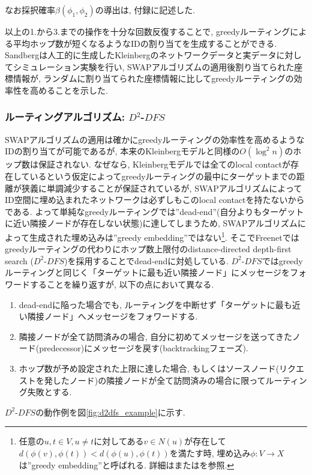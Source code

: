 \documentclass[dvipdfmx]{ampbt}
\begin{document}
   なお採択確率$\beta(\phi_1,\phi_2)$の導出は, 付録に記述した.

   以上の1.から3.までの操作を十分な回数反復することで, greedyルーティングによる平均ホップ数が短くなるようなIDの割り当てを生成することができる. Sandbergは人工的に生成したKleinbergのネットワークデータと実データに対してシミュレーション実験を行い, SWAPアルゴリズムの適用後割り当てられた座標情報が, ランダムに割り当てられた座標情報に比してgreedyルーティングの効率性を高めることを示した.

   \subsubsection{ルーティングアルゴリズム: $D^2$-$DFS$} \label{sec:d2dfs}
   SWAPアルゴリズムの適用は確かにgreedyルーティングの効率性を高めるようなIDの割り当てが可能であるが, 本来のKleinbergモデルと同様の$O(\log^2n)$のホップ数は保証されない. なぜなら, Kleinbergモデルでは全てのlocal contactが存在しているという仮定によってgreedyルーティングの最中にターゲットまでの距離が狭義に単調減少することが保証されているが, SWAPアルゴリズムによってID空間に埋め込まれたネットワークは必ずしもこのlocal contactを持たないからである. よって単純なgreedyルーティングでは''dead-end''(自分よりもターゲットに近い隣接ノードが存在しない状態)に達してしまうため, SWAPアルゴリズムによって生成された埋め込みは''greedy embedding''ではない\footnote{任意の$u,t \in V, u\neq t$に対してある$v \in N(u)$が存在して$d(\phi(v), \phi(t)) < d(\phi(u), \phi(t))$を満たす時, 埋め込み$\phi:V \to X$は''greedy embedding''と呼ばれる. 詳細は\cite{papadimitriou2005conjecture}または\cite{kleinberg2007geographic}を参照.}. そこでFreenetではgreedyルーティングの代わりにホップ数上限付のdistance-directed depth-first search ($D^2$-$DFS$)を採用することでdead-endに対処している\cite{roos2016analyzing}. $D^2$-$DFS$ではgreedyルーティングと同じく「ターゲットに最も近い隣接ノード」にメッセージをフォワードすることを繰り返すが, 以下の点において異なる.
   \begin{enumerate}
    \item dead-endに陥った場合でも, ルーティングを中断せず「ターゲットに最も近い隣接ノード」へメッセージをフォワードする. 
    \item 隣接ノードが全て訪問済みの場合, 自分に初めてメッセージを送ってきたノード(predecessor)にメッセージを戻す(backtrackingフェーズ).
    \item ホップ数が予め設定された上限に達した場合, もしくはソースノード(リクエストを発したノード)の隣接ノードが全て訪問済みの場合に限ってルーティング失敗とする.
   \end{enumerate}
   $D^2$-$DFS$の動作例を図\ref{fig:d2dfs_example}に示す.
\end{document}
